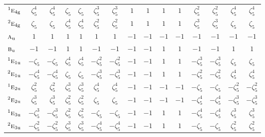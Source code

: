 \documentclass[10pt,a4paper]{article}
\numberwithin{equation}{section}
\newcommand{\irr}[1]{\text{\normalfont\scshape #1}}
\newcommand{\conjpair}[1]{{}^{#1}}
\newcommand{\ptag}[1]{\mathrm{#1}}
\newcommand{\rootunity}[1]{\zeta_{#1}}
\begin{document}
{\begin{longtable}{@{}lcccccccccccccc@{}}
$\conjpair{1}\irr{e}_{4\ptag{g}}$ & $\rootunity{5}^{4}$ & $\rootunity{5}^{4}$ & $\rootunity{5}$ & $\rootunity{5}$ & $\rootunity{5}^{3}$ & $\rootunity{5}^{3}$ & $1$ & $1$ & $1$ & $1$ & $\rootunity{5}^{2}$ & $\rootunity{5}^{2}$ & $\rootunity{5}^{4}$ & $\rootunity{5}^{4}$\\
$\conjpair{2}\irr{e}_{4\ptag{g}}$ & $\rootunity{5}$ & $\rootunity{5}$ & $\rootunity{5}^{4}$ & $\rootunity{5}^{4}$ & $\rootunity{5}^{2}$ & $\rootunity{5}^{2}$ & $1$ & $1$ & $1$ & $1$ & $\rootunity{5}^{3}$ & $\rootunity{5}^{3}$ & $\rootunity{5}$ & $\rootunity{5}$\\
$\irr{a}_{\ptag{u}}$ & $1$ & $1$ & $1$ & $1$ & $1$ & $1$ & $-1$ & $-1$ & $-1$ & $-1$ & $-1$ & $-1$ & $-1$ & $-1$\\
$\irr{b}_{\ptag{u}}$ & $-1$ & $-1$ & $1$ & $1$ & $-1$ & $-1$ & $-1$ & $-1$ & $1$ & $1$ & $-1$ & $-1$ & $1$ & $1$\\
$\conjpair{1}\irr{e}_{1\ptag{u}}$ & $-\rootunity{5}$ & $-\rootunity{5}$ & $\rootunity{5}^{4}$ & $\rootunity{5}^{4}$ & $-\rootunity{5}^{2}$ & $-\rootunity{5}^{2}$ & $-1$ & $-1$ & $1$ & $1$ & $-\rootunity{5}^{3}$ & $-\rootunity{5}^{3}$ & $\rootunity{5}$ & $\rootunity{5}$\\
$\conjpair{2}\irr{e}_{1\ptag{u}}$ & $-\rootunity{5}^{4}$ & $-\rootunity{5}^{4}$ & $\rootunity{5}$ & $\rootunity{5}$ & $-\rootunity{5}^{3}$ & $-\rootunity{5}^{3}$ & $-1$ & $-1$ & $1$ & $1$ & $-\rootunity{5}^{2}$ & $-\rootunity{5}^{2}$ & $\rootunity{5}^{4}$ & $\rootunity{5}^{4}$\\
$\conjpair{1}\irr{e}_{2\ptag{u}}$ & $\rootunity{5}^{2}$ & $\rootunity{5}^{2}$ & $\rootunity{5}^{3}$ & $\rootunity{5}^{3}$ & $\rootunity{5}^{4}$ & $\rootunity{5}^{4}$ & $-1$ & $-1$ & $-1$ & $-1$ & $-\rootunity{5}$ & $-\rootunity{5}$ & $-\rootunity{5}^{2}$ & $-\rootunity{5}^{2}$\\
$\conjpair{2}\irr{e}_{2\ptag{u}}$ & $\rootunity{5}^{3}$ & $\rootunity{5}^{3}$ & $\rootunity{5}^{2}$ & $\rootunity{5}^{2}$ & $\rootunity{5}$ & $\rootunity{5}$ & $-1$ & $-1$ & $-1$ & $-1$ & $-\rootunity{5}^{4}$ & $-\rootunity{5}^{4}$ & $-\rootunity{5}^{3}$ & $-\rootunity{5}^{3}$\\
$\conjpair{1}\irr{e}_{3\ptag{u}}$ & $-\rootunity{5}^{3}$ & $-\rootunity{5}^{3}$ & $\rootunity{5}^{2}$ & $\rootunity{5}^{2}$ & $-\rootunity{5}$ & $-\rootunity{5}$ & $-1$ & $-1$ & $1$ & $1$ & $-\rootunity{5}^{4}$ & $-\rootunity{5}^{4}$ & $\rootunity{5}^{3}$ & $\rootunity{5}^{3}$\\
$\conjpair{2}\irr{e}_{3\ptag{u}}$ & $-\rootunity{5}^{2}$ & $-\rootunity{5}^{2}$ & $\rootunity{5}^{3}$ & $\rootunity{5}^{3}$ & $-\rootunity{5}^{4}$ & $-\rootunity{5}^{4}$ & $-1$ & $-1$ & $1$ & $1$ & $-\rootunity{5}$ & $-\rootunity{5}$ & $\rootunity{5}^{2}$ & $\rootunity{5}^{2}$\\

\end{longtable}}
\end{document}
